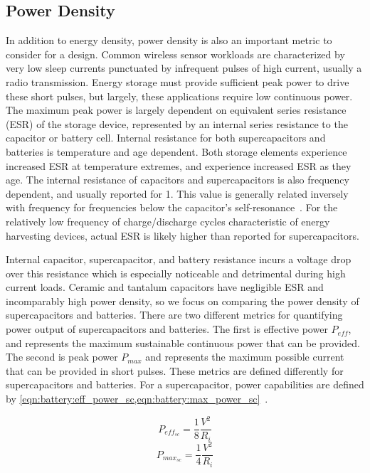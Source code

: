 
\subsection{Power Density}
In addition to energy density, power density is also an important metric to consider for a design. 
Common wireless sensor workloads are characterized by very low sleep currents punctuated by infrequent pulses of high current, usually a radio transmission. Energy storage must provide sufficient peak power to drive these short pulses, but largely, these applications require low continuous power. The maximum peak power is largely dependent on equivalent series resistance (ESR) of the storage device, represented by an internal series resistance to the capacitor or battery cell. 
Internal resistance for both supercapacitors and batteries is temperature and age dependent. Both storage elements experience increased ESR at temperature extremes, and experience increased ESR as they age.
The internal resistance of capacitors and supercapacitors is also frequency dependent, and usually reported for 1\ssi{\kilo\hertz}. This value is generally related inversely with frequency for frequencies below the capacitor's self-resonance~\cite{murataESRArticle}. For the relatively low frequency of charge/discharge cycles characteristic of energy harvesting devices, actual ESR is likely higher than reported for supercapacitors.

Internal capacitor, supercapacitor, and battery resistance incurs a voltage drop over this resistance which is especially noticeable and detrimental during high  current loads.
Ceramic and tantalum capacitors have negligible ESR and incomparably high power density, so we focus on comparing the power density of supercapacitors and batteries.
There are two different metrics for quantifying power output of supercapacitors and batteries. The first is effective power $P_{eff}$, and represents the maximum sustainable continuous power that can be provided. The second is peak power $P_{max}$ and represents the maximum possible current that can be provided in short pulses. These metrics are defined differently for supercapacitors and batteries. For a supercapacitor, power capabilities are defined by \cref{eqn:battery:eff_power_sc,eqn:battery:max_power_sc}~\cite{IEC62391}.

\begin{equation}\label{eqn:battery:eff_power_sc}
P_{eff_{sc}} = \frac{1}{8} \frac{V^2}{R_i}
\end{equation}
\begin{equation}\label{eqn:battery:max_power_sc}
P_{max_{sc}} = \frac{1}{4} \frac{V^2}{R_i}
\end{equation}

